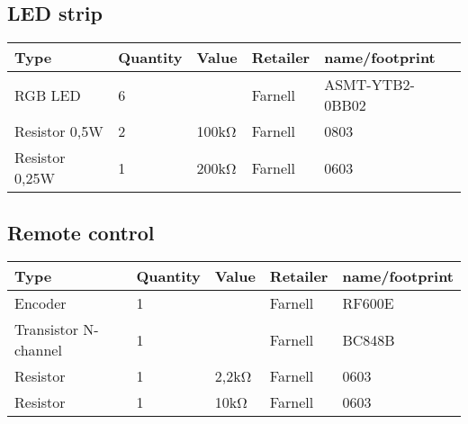 \documentclass[10pt, titlepage]{article}
\begin{document}
\subsection{LED strip}
\begin{center}
\begin{tabularx}{\textwidth}{|X|l|l|l|l|}
    \hline
   \textbf{Type} & \textbf{Quantity} & \textbf{Value} & \textbf{Retailer} & \textbf{name/footprint} \\ \hline
    RGB LED & 6 &  & Farnell & ASMT-YTB2-0BB02 \\ \hline
    Resistor 0,5W  & 2 & 100kΩ & Farnell & 0803 \\ \hline
    Resistor 0,25W & 1 & 200kΩ & Farnell & 0603 \\ \hline
	\end{tabularx}
\end{center}

\subsection{Remote control}
\begin{center}
\begin{tabularx}{\textwidth}{|X|l|l|l|l|}
    \hline
   \textbf{Type} & \textbf{Quantity} & \textbf{Value} & \textbf{Retailer} & \textbf{name/footprint} \\ \hline
    Encoder & 1 &  & Farnell & RF600E \\ \hline
    Transistor N-channel & 1 &  & Farnell & BC848B \\ \hline
    Resistor & 1 & 2,2kΩ & Farnell & 0603 \\ \hline
    Resistor & 1 & 10kΩ & Farnell & 0603 \\ \hline
	\end{tabularx}
\end{center}
\end{document}
